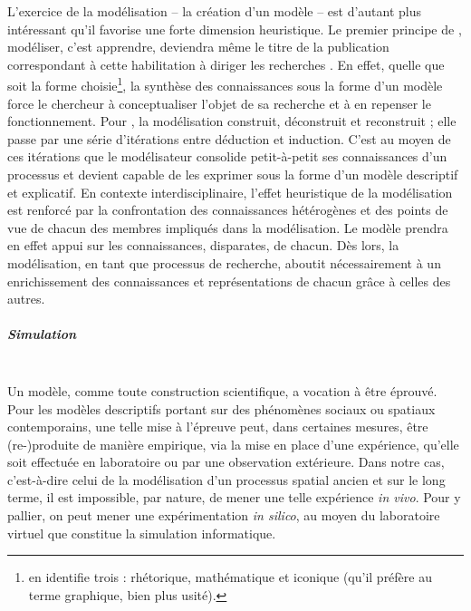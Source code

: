L'exercice de la modélisation -- la création d'un modèle -- est d'autant plus intéressant qu'il favorise une forte dimension heuristique.
Le premier principe de \textcite{banos_pour_2013}, \og modéliser, c'est apprendre\fg{}, deviendra même le titre de la publication correspondant à cette habilitation à diriger les recherches \autocite{banos_modeliser_2016}.
En effet, quelle que soit la forme choisie\footnote{
	\textcite[p.27, \S D]{brunet2000modeles} en identifie trois : \og rhétorique\fg{}, \og mathématique\fg{} et \og iconique\fg{} (qu'il préfère au terme graphique, bien plus usité).
}, la synthèse des connaissances sous la forme d'un modèle force le chercheur à conceptualiser l'objet de sa recherche et à en repenser le fonctionnement.
Pour \textcite[p.28, \S F]{brunet2000modeles}, la modélisation \og construit, déconstruit et reconstruit ; elle passe par une série d'itérations entre déduction et induction\fg{}.
C'est au moyen de ces itérations que le modélisateur consolide petit-à-petit ses connaissances d'un processus et devient capable de les exprimer sous la forme d'un modèle descriptif et explicatif.
En contexte interdisciplinaire, l'effet heuristique de la modélisation est renforcé par la confrontation des connaissances hétérogènes et des points de vue de chacun des membres impliqués dans la modélisation.
Le modèle prendra en effet appui sur les connaissances, disparates, de chacun.
Dès lors, la modélisation, en tant que processus de recherche, aboutit nécessairement à un enrichissement des connaissances et représentations de chacun grâce à celles des autres.

\subparagraph{Simulation}~\\
Un modèle, comme toute construction scientifique, a vocation à être éprouvé.
Pour les modèles descriptifs portant sur des phénomènes sociaux ou spatiaux contemporains, une telle mise à l'épreuve peut, dans certaines mesures, être (re-)produite de manière empirique, via la mise en place d'une expérience, qu'elle soit effectuée \og en laboratoire\fg{} ou par une observation extérieure.
Dans notre cas, c'est-à-dire celui de la modélisation d'un processus spatial ancien et sur le long terme, il est impossible, par nature, de mener une telle expérience \textit{in vivo}.
Pour y pallier, on peut mener une expérimentation \textit{in silico}, au moyen du \og laboratoire virtuel\fg{} que constitue la simulation informatique.


